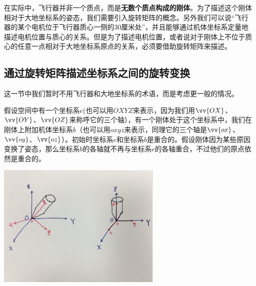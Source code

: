 \documentclass[11pt]{article}
\begin{document}
在实际中，飞行器并非一个质点，而是\textbf{无数个质点构成的刚体}。为了描述这个刚体相对于大地坐标系的姿态，我们需要引入旋转矩阵的概念。另外我们可以说“飞行器的某个电机位于飞行器质心一侧的30厘米处”，并且能够通过机体坐标系定量地描述电机位置与质心的关系。但是为了描述电机位置，或者说对于刚体上不位于质心的任意一点相对于大地坐标系原点的关系，必须要借助旋转矩阵来描述。
\subsection{通过旋转矩阵描述坐标系之间的旋转变换}\label{sec:rotationmtxdefinition}
这一节中我们暂时不用飞行器和大地坐标系的术语，而是考虑更一般的情况。

假设空间中有一个坐标系$e$(也可以用$OXYZ$来表示，因为我们用$\vv{OX}$、$\vv{OY}$、$\vv{OZ}$来称呼它的三个轴），有一个刚体处于这个坐标系中，我们在刚体上附加机体坐标系$b$（也可以用$oxyz$来表示，同理它的三个轴是$\vv{ox}$、$\vv{oy}$、$\vv{oz}$）。初始时坐标系$e$和坐标系$b$是重合的。假设刚体因为某些原因变换了姿态，那么坐标系$b$的各轴就不再与坐标系$e$的各轴重合，不过他们的原点依然是重合的。

\begin{center}
\includegraphics[width=0.6\textwidth]{images/IMG_2295.jpg}
\end{center}
\end{document}
